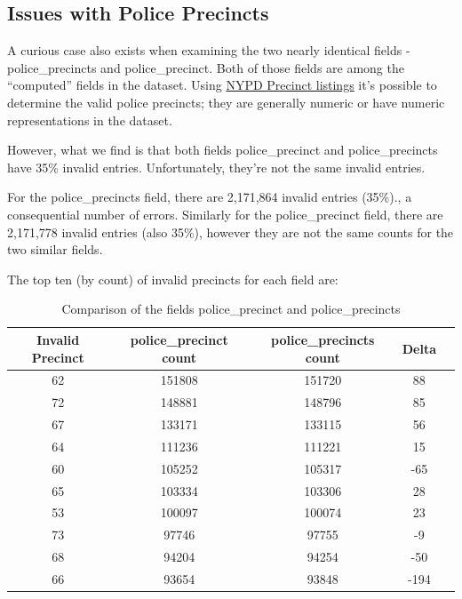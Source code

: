\documentclass[12pt, titlepage]{article}
\begin{document}
\subsection{Issues with Police Precincts} 	
\label{sec:police-precincts}
	A curious case also exists when examining the two nearly identical 
	fields - police\_precincts and police\_precinct. Both of those fields 
	are among the ``computed'' fields in the dataset. Using 
	\href{https://www.nyc.gov/site/nypd/bureaus/patrol/precincts-landing.page}
	{NYPD Precinct listings} it's possible to determine the valid 
	police precincts; they are generally numeric or have numeric 
	representations in the dataset. 
	
	However, what we find is that both fields police\_precinct 
	and police\_precincts  have  35\% invalid entries. Unfortunately, 
	they're not the same invalid entries. 
	
	For the police\_precincts field, there are 2,171,864 invalid entries 
	(35\%)., a consequential number of errors. Similarly for the 
	police\_precinct field, there are 2,171,778 invalid entries 
	(also 35\%), however they are not the same counts for the two similar fields.

	The top ten (by count) of invalid precincts for each field are:

	\begin{table}[tbp]
	\centering
	\caption{Comparison of the fields police\_precinct and police\_precincts}
		\begin{tabular}{ccccc}
		\toprule
		\textbf{Invalid Precinct} & \textbf{police\_precinct count} 
		& \textbf{police\_precincts count} & \textbf{Delta}\\
		\midrule
				62 & 151808 & 151720 & 88 \\
				72 & 148881 & 148796 & 85 \\
				67 & 133171 & 133115 & 56 \\
				64 & 111236 & 111221 & 15 \\
				60 & 105252 & 105317 & -65 \\
				65 & 103334 & 103306 & 28 \\
				53 & 100097 & 100074 & 23 \\
				73 & 97746 & 97755 & -9 \\
				68 & 94204 & 94254 & -50 \\
				66 & 93654 & 93848 & -194 \\
		\bottomrule
		\end{tabular}
	\label{tab:comparison-precincts-diff}
	\end{table}
	
\end{document}
